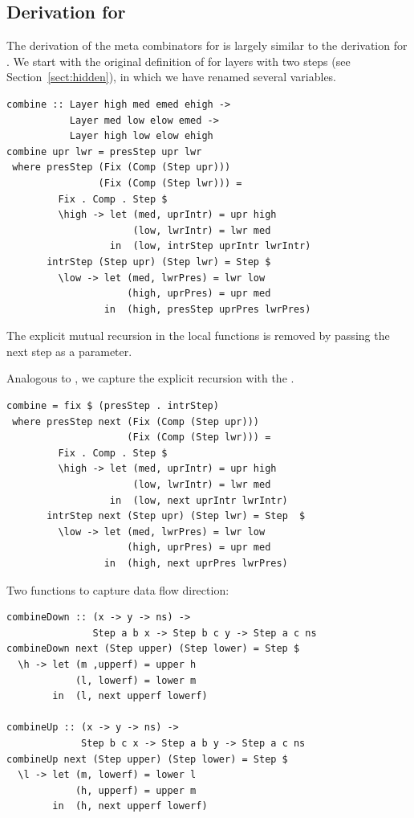 \documentclass[preprint,natbib]{sigplanconf}
\begin{document}
%																
\subsection{Derivation for } \label{subsubsectcombine}


The derivation of the meta combinators for  is largely similar to the derivation for . We start with the original definition of  for layers with two steps (see Section~\ref{sect:hidden}), in which we have renamed several variables. 


\begin{small} %
\begin{verbatim}
combine :: Layer high med emed ehigh -> 
           Layer med low elow emed -> 
           Layer high low elow ehigh
combine upr lwr = presStep upr lwr
 where presStep (Fix (Comp (Step upr))) 
                (Fix (Comp (Step lwr))) = 
         Fix . Comp . Step $ 
         \high -> let (med, uprIntr) = upr high
                      (low, lwrIntr) = lwr med
                  in  (low, intrStep uprIntr lwrIntr)
       intrStep (Step upr) (Step lwr) = Step $
         \low -> let (med, lwrPres) = lwr low
                     (high, uprPres) = upr med
                 in  (high, presStep uprPres lwrPres)
\end{verbatim}
\end{small}

The explicit mutual recursion in the local functions is removed by passing the next step as a parameter.

Analogous to , we capture the explicit recursion with the .

\begin{small} %
\begin{verbatim}
combine = fix $ (presStep . intrStep) 
 where presStep next (Fix (Comp (Step upr)))
                     (Fix (Comp (Step lwr))) =
         Fix . Comp . Step $ 
         \high -> let (med, uprIntr) = upr high
                      (low, lwrIntr) = lwr med
                  in  (low, next uprIntr lwrIntr)
       intrStep next (Step upr) (Step lwr) = Step  $
         \low -> let (med, lwrPres) = lwr low
                     (high, uprPres) = upr med
                 in  (high, next uprPres lwrPres)
\end{verbatim}%
\end{small}


Two functions to capture data flow direction:

\begin{small} %
\begin{verbatim}
combineDown :: (x -> y -> ns) ->
               Step a b x -> Step b c y -> Step a c ns
combineDown next (Step upper) (Step lower) = Step $
  \h -> let (m ,upperf) = upper h
            (l, lowerf) = lower m
        in  (l, next upperf lowerf)   

combineUp :: (x -> y -> ns) -> 
             Step b c x -> Step a b y -> Step a c ns
combineUp next (Step upper) (Step lower) = Step $ 
  \l -> let (m, lowerf) = lower l
            (h, upperf) = upper m
        in  (h, next upperf lowerf)   
\end{verbatim}%
\end{small}
\end{document}
